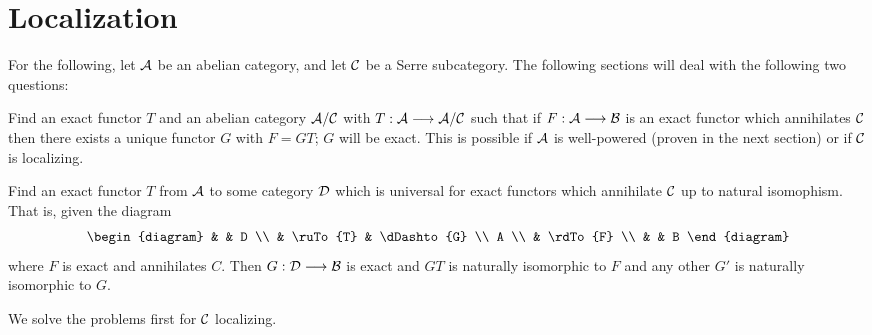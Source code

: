 \section{Localization}

\noindent For the following, let $\mathcal{A}$ be an abelian 
category, and let $\mathcal{C}$ be a Serre subcategory. The following 
sections will deal with the following two questions:

 Find an exact functor $T$ and an 
abelian category $\mathcal{A}/\mathcal{C}$ with $T: \mathcal{A} \longrightarrow 
\mathcal{A}/\mathcal{C}$ such that if $F: \mathcal{A} \longrightarrow \mathcal{B}$ is an 
exact functor which annihilates $\mathcal{C}$ then there exists a 
unique functor $G$ with $F = GT$; $G$ will be exact. This is 
possible if $\mathcal{A}$ is well-powered (proven in the next 
section) or if $\mathcal{C}$ is localizing.

\vskip 10pt

 Find an exact functor $T$ from 
$\mathcal{A}$ to some category $\mathcal{D}$ which is universal for exact 
functors which annihilate $\mathcal{C}$ up to natural isomophism. 
That is, given the diagram
\[
\begin{diagram}
   &          & D           \\
   & \ruTo{T} & \dDashto{G} \\
 A \\
   & \rdTo{F} \\
   &          & B
\end{diagram}
\]
where $F$ is exact and annihilates $C$. Then $G: \mathcal{D} \longrightarrow
\mathcal{B}$ is exact and $GT$ is naturally isomorphic to $F$
and any other $G'$ is naturally isomorphic to $G$.

We solve the problems first for $\mathcal{C}$ localizing.


